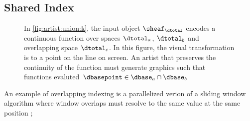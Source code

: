 \documentclass[10pt,journal,compsoc]{IEEEtran}
\theoremstyle{definition}
\theoremstyle{remark}
\begin{document}
\subsection{Shared Index}
\begin{figure}[!h]
  \centering
  \caption{In \autoref{fig:artist:union:k}, the input object $\sheaf_{\dtotal}$ encodes a continuous function over spaces $\dtotal_a$, $\dtotal_b$ 
  and overlapping space $\dtotal_c$. In this figure, the visual transformation is to a point on the line on screen. An artist that preserves the continuity of the function must generate graphics such that functions evaluted  $\dbasepoint \in \dbase_a \cap \dbase_b$}
\end{figure}

An example of overlapping indexing is a parallelized verion of a sliding window algorithm where window overlaps must resolve to the same value at the same position \cite{chuTimeSeriesSegmentation1995}; 
\end{document}
